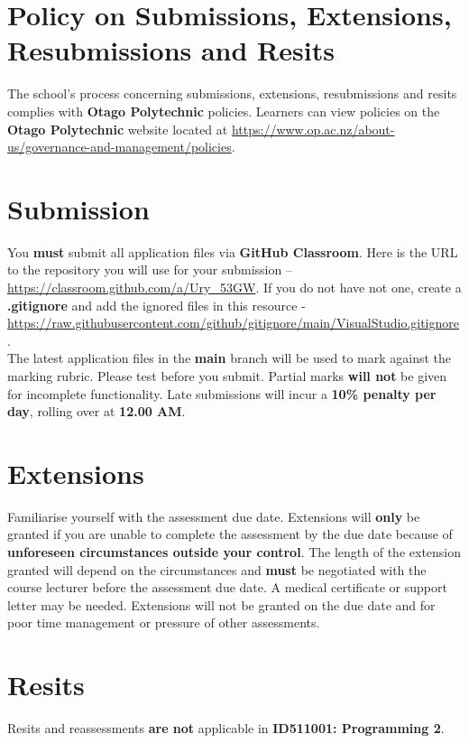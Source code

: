 \documentclass{article}
\begin{document}
\section*{Policy on Submissions, Extensions, Resubmissions and Resits}
The school's process concerning submissions, extensions, resubmissions and resits complies with \textbf{Otago Polytechnic} policies. Learners can view policies on the \textbf{Otago Polytechnic} website located at \href{https://www.op.ac.nz/about-us/governance-and-management/policies}{https://www.op.ac.nz/about-us/governance-and-management/policies}.

\section*{Submission}
You \textbf{must} submit all application files via \textbf{GitHub Classroom}. Here is the URL to the repository you will use for your submission – \href{https://classroom.github.com/a/Ury\_53GW}{https://classroom.github.com/a/Ury\_53GW}. If you do not have not one, create a \textbf{.gitignore} and add the ignored files in this resource - \href{https://raw.githubusercontent.com/github/gitignore/main/VisualStudio.gitignore}{https://raw.githubusercontent.com/github/gitignore/main/VisualStudio.gitignore}. \\

The latest application files in the \textbf{main} branch will be used to mark against the marking rubric. Please test before you submit. Partial marks \textbf{will not} be given for incomplete functionality. Late submissions will incur a \textbf{10\% penalty per day}, rolling over at \textbf{12.00 AM}.

\section*{Extensions}
Familiarise yourself with the assessment due date. Extensions will \textbf{only} be granted if you are unable to complete the assessment by the due date because of \textbf{unforeseen circumstances outside your control}. The length of the extension granted will depend on the circumstances and \textbf{must} be negotiated with the course lecturer before the assessment due date. A medical certificate or support letter may be needed. Extensions will not be granted on the due date and for poor time management or pressure of other assessments.

\section*{Resits}
Resits and reassessments \textbf{are not} applicable in \textbf{ID511001: Programming 2}.
\end{document}
